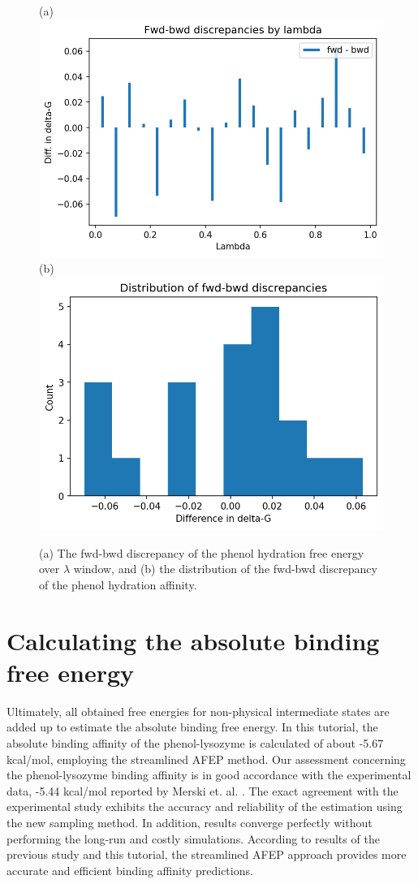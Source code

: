 \documentclass[9pt,tutorial]{livecoms}
\begin{document}
\begin{figure}[h!t]
\centering
(a)
\includegraphics[width=0.8\linewidth]{Supp-Files/AFEP-Hydration/output/Alchemlyb/output_14_1.png}
\\
\centering
(b)
\includegraphics[width=0.8\linewidth]{Supp-Files/AFEP-Hydration/output/Alchemlyb/output_16_1.png}
\caption{(a) The fwd-bwd discrepancy of the phenol hydration free energy over $\lambda$ window, and (b) the distribution of the fwd-bwd discrepancy of the phenol hydration affinity. }
\label{fig:AFEP-Hyd-2}
\end{figure}


\section{Calculating the absolute binding free energy}\label{sec:12}

Ultimately, all obtained free energies for non-physical intermediate states are added up to estimate the absolute binding free energy. In this tutorial, the absolute binding affinity of the phenol-lysozyme is calculated of about -5.67 kcal/mol, employing the streamlined AFEP method. Our assessment concerning the phenol-lysozyme binding affinity is in good accordance with the experimental data, -5.44 kcal/mol reported by Merski et. al. \cite{Merski2013}. The exact agreement with the experimental study exhibits the accuracy and reliability of the estimation using the new sampling method. In addition, results converge perfectly without performing the long-run and costly simulations. According to results of the previous study \cite{Salari2018} and this tutorial, the streamlined AFEP approach provides more accurate and efficient binding affinity predictions.
\end{document}
